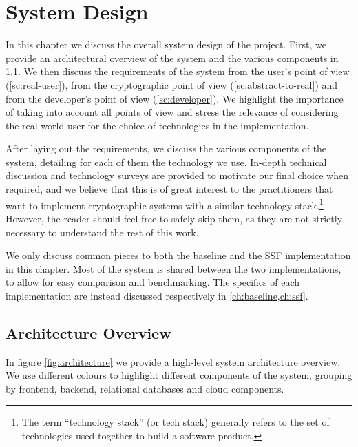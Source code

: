 \chapter{System Design}\label{ch:setup}

In this chapter we discuss the overall system design of the project.
First, we provide an architectural overview
of the system and the various components in \cref{sc:architectural-overview}.
We then discuss the requirements of the system from the user's point of view
(\cref{sc:real-user}), from the cryptographic point of view
(\cref{sc:abstract-to-real}) and from the developer's point of view
(\cref{sc:developer}). We highlight the importance
of taking into account all points of view and stress the 
relevance of considering the real-world
user for the choice of technologies in the implementation. 

After laying out the requirements, we discuss the various
components of the system, detailing for each of them
the technology we use. In-depth technical
discussion and technology surveys are provided
to motivate our final choice when required, and we believe
that this is of great interest to the practitioners
that want to implement cryptographic systems with 
a similar technology stack.\footnote{The term ``technology stack'' (or tech stack) generally refers to the set of technologies used together to build a software product.}
However, the reader should feel free to safely skip
them, as they are not strictly necessary to understand 
the rest of this work.

We only discuss common
pieces to both the baseline and the SSF implementation
in this chapter. Most of the system is
shared between the two implementations, to allow
for easy comparison and benchmarking.
The specifics of each implementation are instead discussed respectively in \cref{ch:baseline,ch:ssf}.

\section{Architecture Overview}\label{sc:architectural-overview}

In figure \cref{fig:architecture} we provide a high-level system architecture overview.
We use different colours to highlight different components of the system, grouping
by frontend, backend, relational databases and cloud components.

